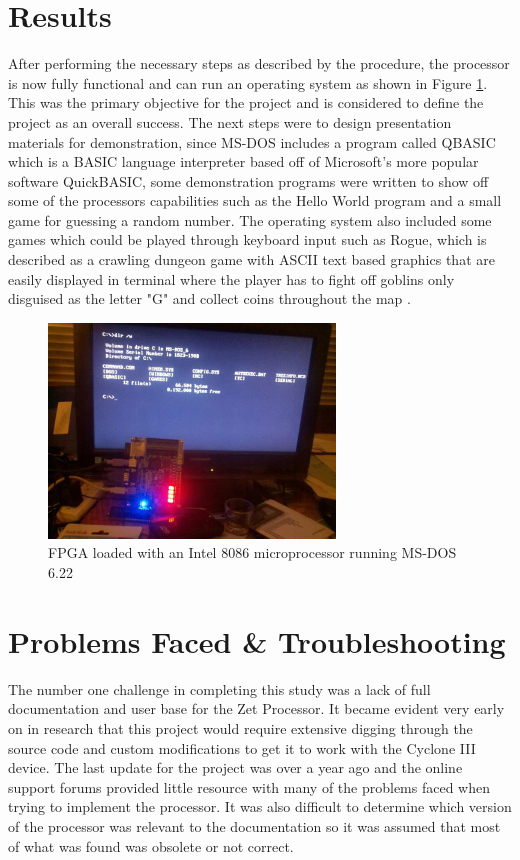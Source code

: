 \documentclass[pdftex,10.5pt]{report}
\begin{document}
\section{Results}
After performing the necessary steps as described by the procedure, the processor is now fully functional and can run an operating system as shown in Figure \ref{fig:WorkingFPGA}. This was the primary objective for the project and is considered to define the project as an overall success. The next steps were to design presentation materials for demonstration, since MS-DOS includes a program called QBASIC which is a BASIC language interpreter based off of Microsoft's more popular software QuickBASIC, some demonstration programs were written to show off some of the processors capabilities such as the Hello World program and a small game for guessing a random number. The operating system also included some games which could be played through keyboard input such as Rogue, which is described as a crawling dungeon game with ASCII text based graphics that are easily displayed in terminal where the player has to fight off goblins only disguised as the letter "G" and collect coins throughout the map \cite{Rogue}. 

\begin{figure}[!h]
	\centering
	\includegraphics[width=3in]{figures/fpgaworking.jpg}
	\caption{FPGA loaded with an Intel 8086 microprocessor running MS-DOS 6.22}
	\label{fig:WorkingFPGA}
\end{figure}

\section{Problems Faced \& Troubleshooting}
The number one challenge in completing this study was a lack of full documentation and user base for the Zet Processor. It became evident very early on in research that this project would require extensive digging through the source code and custom modifications to get it to work with the Cyclone III device. The last update for the project was over a year ago and the online support forums provided little resource with many of the problems faced when trying to implement the processor. It was also difficult to determine which version of the processor was relevant to the documentation so it was assumed that most of what was found was obsolete or not correct.
\end{document}
